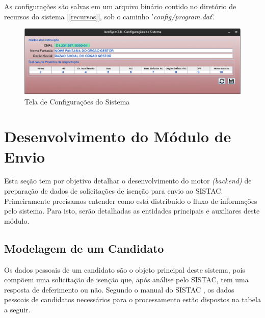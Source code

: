 \documentclass[
	12pt,			%
	openright,		%
	oneside,	
	a4paper,		%
	english,		%
	brazil			%
]{abntex2/abntex2}  %
\begin{document}
			As configurações são salvas em um arquivo binário contido no diretório de recursos do sistema [\ref{recursos}], sob o caminho '\textit{config/program.dat}'.

			\begin{figure}[ht]
				\begin{center}
					
					\caption{Tela de Configurações do Sistema}
					\label{configs-img}
					
					\includegraphics[scale=0.45]{img/configs-ui}
					
				\end{center}
			\end{figure}

		\section{Desenvolvimento do Módulo de Envio}
	
			Esta seção tem por objetivo detalhar o desenvolvimento do motor \textit{(backend)} de preparação de dados de solicitações de isenção para envio ao SISTAC. Primeiramente precisamos entender como está distribuído o fluxo de informações pelo sistema. Para isto, serão detalhadas as entidades principais e auxiliares deste módulo.
	
			\subsection{Modelagem de um Candidato} \label{candidato}
	
				Os dados pessoais de um candidato são o objeto principal deste sistema, pois compõem uma solicitação de isenção que, após análise pelo SISTAC, tem uma resposta de deferimento ou não. Segundo o manual do SISTAC \cite{sistac-formatos}, os dados pessoais de candidatos necessários para o processamento estão dispostos na tabela a seguir.
\end{document}
